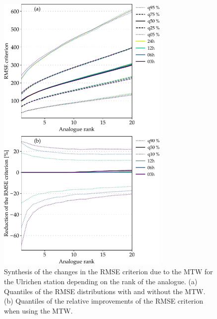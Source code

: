 \documentclass[hess, manuscript]{copernicus}
\begin{document}
	\begin{figure}[htb]
		\begin{center}
			\includegraphics[width=8.3cm]{fig09.pdf}
		\end{center}
		\caption{Synthesis of the changes in the RMSE criterion due to the MTW for the Ulrichen station depending on the rank of the analogue. (a) Quantiles of the RMSE distributions with and without the MTW. (b) Quantiles of the relative improvements of the RMSE criterion when using the MTW.}
		\label{fig:changes_RMSE}
	\end{figure}
	
\end{document}
